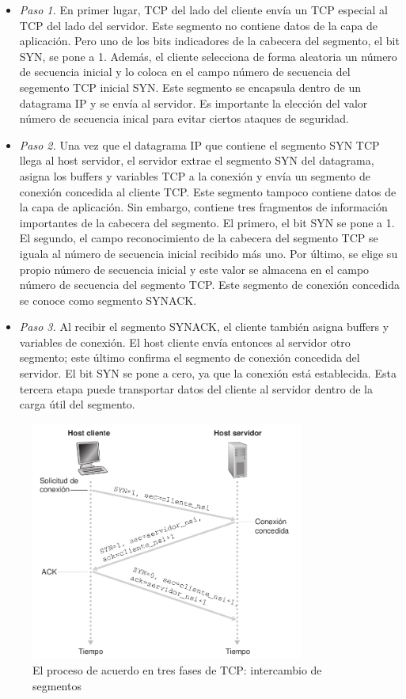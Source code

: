 \documentclass[a4paper,11pt]{article}
\begin{document}
\begin{itemize}
\item \textit{Paso 1.} En primer lugar, TCP del lado del cliente envía un TCP especial al TCP del lado del servidor. Este segmento no contiene datos de la capa de aplicación. Pero uno de los bits indicadores de la cabecera del segmento, el bit SYN, se pone a 1. Además, el cliente selecciona de forma aleatoria un número de secuencia inicial y lo coloca en el campo número de secuencia del segemento TCP inicial SYN. Este segmento se encapsula dentro de un datagrama IP y se envía al servidor. Es importante la elección del valor número de secuencia inical para evitar ciertos ataques de seguridad.

\item \textit{Paso 2.} Una vez que el datagrama IP que contiene el segmento SYN TCP llega al host servidor, el servidor extrae el segmento SYN del datagrama, asigna los buffers y variables TCP a la conexión y envía un segmento de conexión concedida al cliente TCP. Este segmento tampoco contiene datos de la capa de aplicación. Sin embargo, contiene tres fragmentos de información importantes de la cabecera del segmento. El primero, el bit SYN se pone a 1. El segundo, el campo reconocimiento de la cabecera del segmento TCP se iguala al número de secuencia inicial recibido más uno. Por último, se elige su propio número de secuencia inicial y este valor se almacena en el campo número de secuencia del segmento TCP. Este segmento de conexión concedida se conoce como segmento SYNACK.

\item \textit{Paso 3.} Al recibir el segmento SYNACK, el cliente también asigna buffers y variables de conexión. El host cliente envía entonces al servidor otro segmento; este último confirma el segmento de conexión concedida del servidor. El bit SYN se pone a cero, ya que la conexión está establecida. Esta tercera etapa puede transportar datos del cliente al servidor dentro de la carga útil del segmento.
\end{itemize}

\begin{figure}[h]
\centering
\caption{El proceso de acuerdo en tres fases de TCP: intercambio de segmentos}
\includegraphics[scale=1,width=0.8\textwidth]{conexion_tcp.png}
\end{figure}
\end{document}

